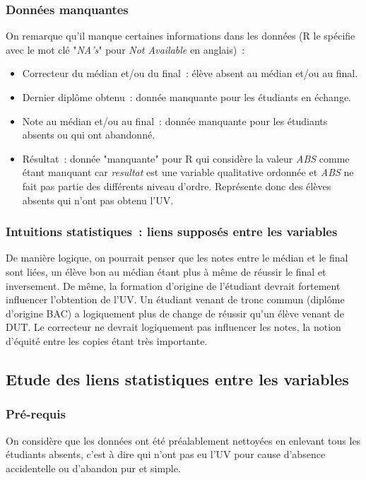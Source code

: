 \documentclass[a4paper,10pt]{report}
\begin{document}
\subsubsection{Données manquantes}
On remarque qu'il manque certaines informations dans les données (R le spécifie avec le mot clé "\textit{NA's}" pour \textit{Not Available} en anglais)~:
\begin{itemize}
	\item Correcteur du médian et/ou du final~: élève absent au médian et/ou au final.
	\item Dernier diplôme obtenu~: donnée manquante pour les étudiants en échange.
	\item Note au médian et/ou au final~: donnée manquante pour les étudiants absents ou qui ont abandonné.
	\item Résultat~: donnée "manquante" pour R qui considère la valeur \textit{ABS} comme étant manquant car \textit{resultat} est une variable qualitative ordonnée et \textit{ABS} ne fait pas partie des différents niveau d'ordre. Représente donc des élèves absents qui n'ont pas obtenu l'UV.
\end{itemize}


\subsubsection{Intuitions statistiques~: liens supposés entre les variables}
De manière logique, on pourrait penser que les notes entre le médian et le final sont liées, un élève bon au médian étant plus à même de réussir le final et inversement. De même, la formation d'origine de l'étudiant devrait fortement influencer l'obtention de l'UV. Un étudiant venant de tronc commun (diplôme d'origine BAC) a logiquement plus de change de réussir qu'un élève venant de DUT. Le correcteur ne devrait logiquement pas influencer les notes, la notion d'équité entre les copies étant très importante.




\subsection{Etude des liens statistiques entre les variables}

\subsubsection{Pré-requis}
On considère que les données ont été préalablement nettoyées en enlevant tous les étudiants absents, c'est à dire qui n'ont pas eu l'UV pour cause d'absence accidentelle ou d'abandon pur et simple.
\end{document}
